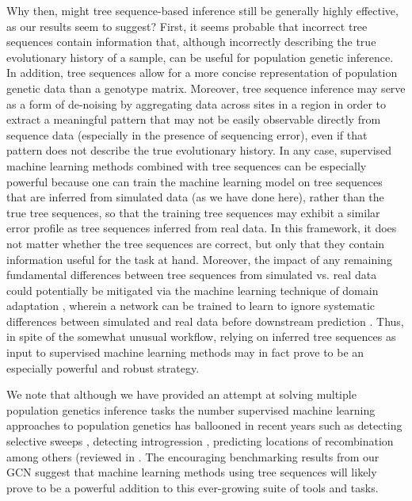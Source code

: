Why then, might tree sequence-based inference still be generally highly effective, as our results seem to suggest? First, it seems probable that incorrect tree sequences contain information that, although incorrectly describing the true evolutionary history of a sample, can be useful for population genetic inference. In addition, tree sequences allow for a more concise representation of population genetic data than a genotype matrix. Moreover, tree sequence inference may serve as a form of de-noising by aggregating data across sites in a region in order to extract a meaningful pattern that may not be easily observable directly from sequence data (especially in the presence of sequencing error), even if that pattern does not describe the true evolutionary history. In any case, supervised machine learning methods combined with tree sequences can be especially powerful because one can train the machine learning model on tree sequences that are inferred from simulated data (as we have done here), rather than the true tree sequences, so that the training tree sequences may exhibit a similar error profile as tree sequences inferred from real data. In this framework, it does not matter whether the tree sequences are correct, but only that they contain information useful for the task at hand. Moreover, the impact of any remaining fundamental differences between tree sequences from simulated vs. real data could potentially be mitigated via the machine learning technique of domain adaptation \cite{ganinUnsupervisedDomainAdaptation2015}, wherein a network can be trained to learn to ignore systematic differences between simulated and real data before downstream prediction \cite{moDomainadaptiveNeuralNetworks2023}. Thus, in spite of the somewhat unusual workflow, relying on inferred tree sequences as input to supervised machine learning methods may in fact prove to be an especially powerful and robust strategy.

We note that although we have provided an attempt at solving multiple population genetics inference tasks the number supervised machine learning approaches to population genetics has ballooned in recent years such as detecting selective sweeps \cite{hejaseDeepLearningApproachInference2022,kernDiploSHICUpdated2018,whitehouseTimesweeperAccuratelyIdentifying2023}, detecting introgression \cite{gowerDetectingAdaptiveIntrogression2021,rayIntroUNETIdentifyingIntrogressed2023,schriderSupervisedMachineLearning2018a}, predicting locations of recombination \cite{adrionPredictingLandscapeRecombination2020} among others (reviewed in \cite{flagelUnreasonableEffectivenessConvolutional2019,korfmannDeepLearningPopulation2023a,schriderSupervisedMachineLearning2018}. The encouraging benchmarking results from our GCN suggest that machine learning methods using tree sequences will likely prove to be a powerful addition to this ever-growing suite of tools and tasks. 

